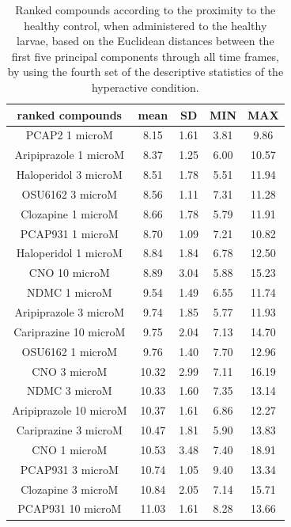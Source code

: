 \documentclass[a4paper,12pt]{article}
\begin{document}
\begin{table}[h!]\tiny
\centering
\caption{Ranked compounds according to the proximity to the healthy control, when administered to the healthy larvae, based on the Euclidean distances between the first five principal components through all time frames, by using the fourth set of the descriptive statistics of the hyperactive condition.}
\begin{tabular}{|c|c|c|c|c|}
\hline
ranked compounds             & mean & SD   & MIN  & MAX   \\ \hline
PCAP2 1 microM         & 8.15  & 1.61 & 3.81  & 9.86  \\ \hline
Aripiprazole 1 microM  & 8.37  & 1.25 & 6.00     & 10.57 \\ \hline
Haloperidol 3 microM   & 8.51  & 1.78 & 5.51  & 11.94 \\ \hline
OSU6162 3 microM       & 8.56  & 1.11 & 7.31  & 11.28 \\ \hline
Clozapine 1 microM     & 8.66  & 1.78 & 5.79  & 11.91 \\ \hline
PCAP931 1 microM       & 8.70   & 1.09 & 7.21  & 10.82 \\ \hline
Haloperidol 1 microM   & 8.84  & 1.84 & 6.78  & 12.50  \\ \hline
CNO 10 microM          & 8.89  & 3.04 & 5.88  & 15.23 \\ \hline
NDMC 1 microM          & 9.54  & 1.49 & 6.55  & 11.74 \\ \hline
Aripiprazole 3 microM  & 9.74  & 1.85 & 5.77  & 11.93 \\ \hline
Cariprazine 10 microM  & 9.75  & 2.04 & 7.13  & 14.70  \\ \hline
OSU6162 1 microM       & 9.76  & 1.40  & 7.70   & 12.96 \\ \hline
CNO 3 microM           & 10.32 & 2.99 & 7.11  & 16.19 \\ \hline
NDMC 3 microM          & 10.33 & 1.60  & 7.35  & 13.14 \\ \hline
Aripiprazole 10 microM & 10.37 & 1.61 & 6.86  & 12.27 \\ \hline
Cariprazine 3 microM   & 10.47 & 1.81 & 5.90   & 13.83 \\ \hline
CNO 1 microM           & 10.53 & 3.48 & 7.40   & 18.91 \\ \hline
PCAP931 3 microM       & 10.74 & 1.05 & 9.40   & 13.34 \\ \hline
Clozapine 3 microM     & 10.84 & 2.05 & 7.14  & 15.71 \\ \hline
PCAP931 10 microM      & 11.03 & 1.61 & 8.28  & 13.66 \\ \hline

\end{tabular}
\end{table}
\end{document}
